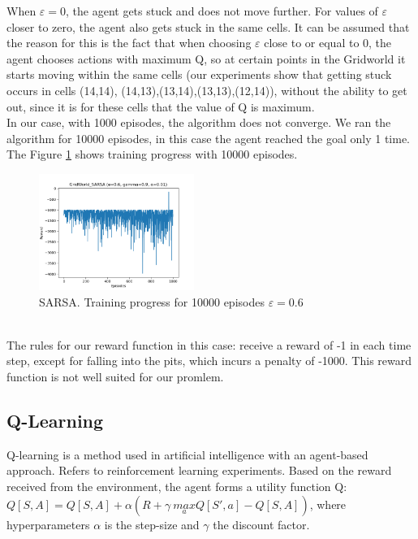\documentclass[a4paper, twoside, english]{article}
\begin{document}
When $\varepsilon=0$, the agent gets stuck and does not move further. For values of $\varepsilon$ closer to zero, the agent also gets stuck in the same cells. It can be assumed that the reason for this is the fact that when choosing $\varepsilon$ close to or equal to 0, the agent chooses actions with maximum Q, so at certain points in the Gridworld it starts moving within the same cells (our experiments show that getting stuck occurs in cells (14,14), (14,13),(13,14),(13,13),(12,14)), without the ability to get out, since it is for these cells that the value of Q is maximum.\\
In our case, with 1000 episodes, the algorithm does not converge. We ran the algorithm for 10000 episodes, in this case the agent reached the goal only 1 time. The Figure \ref{fig:SARSA_1_10000} shows training progress with 10000 episodes.\\
\begin{figure}[h!]
	\centerline{\includegraphics[width=0.45\textwidth]{SARSA_R1_10000.png}}
	\caption[null]{SARSA. Training progress for 10000 episodes $\varepsilon=0.6$}
	\label{fig:SARSA_1_10000}
\end{figure}
~\\
The rules for our reward function in this case: receive a reward of -1 in each time step, except for falling into the pits, which incurs a penalty of -1000. This reward function is not well suited for our promlem.

\newpage


\subsection{Q-Learning}
Q-learning is a method used in artificial intelligence with an agent-based approach. Refers to reinforcement learning experiments. Based on the reward received from the environment, the agent forms a utility function Q:\\
$Q[S,A] = Q[S,A] + \alpha(R+\gamma \ \underset{a}{max}Q[S', a] - Q[S,A])$, where hyperparameters $\alpha$ is the step-size and $\gamma$ the discount factor.\\
\end{document}
